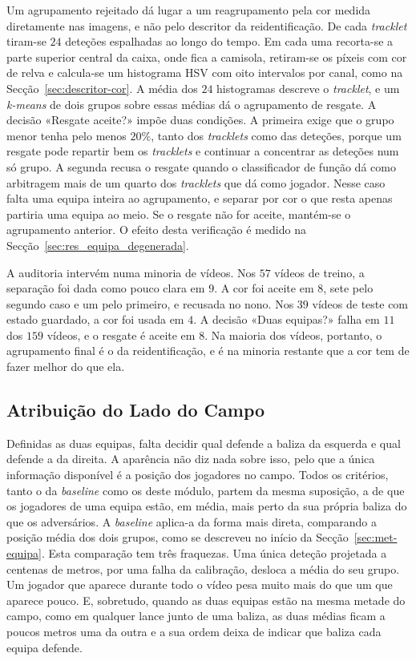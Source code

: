 Um agrupamento rejeitado dá lugar a um reagrupamento pela cor medida diretamente nas imagens, e não pelo descritor da reidentificação. De cada \emph{tracklet} tiram-se $24$ deteções espalhadas ao longo do tempo. Em cada uma recorta-se a parte superior central da caixa, onde fica a camisola, retiram-se os píxeis com cor de relva e calcula-se um histograma HSV com oito intervalos por canal, como na Secção~\ref{sec:descritor-cor}. A média dos $24$ histogramas descreve o \emph{tracklet}, e um \emph{k-means} de dois grupos sobre essas médias dá o agrupamento de resgate. A decisão «Resgate aceite?» impõe duas condições. A primeira exige que o grupo menor tenha pelo menos $20\%$, tanto dos \emph{tracklets} como das deteções, porque um resgate pode repartir bem os \emph{tracklets} e continuar a concentrar as deteções num só grupo. A segunda recusa o resgate quando o classificador de função dá como arbitragem mais de um quarto dos \emph{tracklets} que dá como jogador. Nesse caso falta uma equipa inteira ao agrupamento, e separar por cor o que resta apenas partiria uma equipa ao meio. Se o resgate não for aceite, mantém-se o agrupamento anterior. O efeito desta verificação é medido na Secção~\ref{sec:res_equipa_degenerada}.

A auditoria intervém numa minoria de vídeos. Nos $57$ vídeos de treino, a separação foi dada como pouco clara em $9$. A cor foi aceite em $8$, sete pelo segundo caso e um pelo primeiro, e recusada no nono. Nos $39$ vídeos de teste com estado guardado, a cor foi usada em $4$. A decisão «Duas equipas?» falha em $11$ dos $159$ vídeos, e o resgate é aceite em $8$. Na maioria dos vídeos, portanto, o agrupamento final é o da reidentificação, e é na minoria restante que a cor tem de fazer melhor do que ela.

\subsection{Atribuição do Lado do Campo}\label{sec:mapeamento}

Definidas as duas equipas, falta decidir qual defende a baliza da esquerda e qual defende a da direita. A aparência não diz nada sobre isso, pelo que a única informação disponível é a posição dos jogadores no campo. Todos os critérios, tanto o da \emph{baseline} como os deste módulo, partem da mesma suposição, a de que os jogadores de uma equipa estão, em média, mais perto da sua própria baliza do que os adversários. A \emph{baseline} aplica-a da forma mais direta, comparando a posição média dos dois grupos, como se descreveu no início da Secção~\ref{sec:met-equipa}. Esta comparação tem três fraquezas. Uma única deteção projetada a centenas de metros, por uma falha da calibração, desloca a média do seu grupo. Um jogador que aparece durante todo o vídeo pesa muito mais do que um que aparece pouco. E, sobretudo, quando as duas equipas estão na mesma metade do campo, como em qualquer lance junto de uma baliza, as duas médias ficam a poucos metros uma da outra e a sua ordem deixa de indicar que baliza cada equipa defende.

